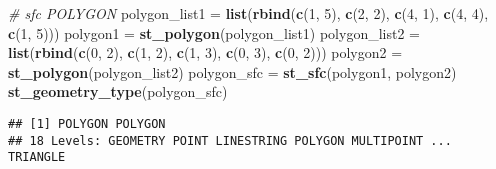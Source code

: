 \documentclass[]{article}
\newenvironment{Shaded}{\begin{snugshade}}{\end{snugshade}}
\newcommand{\CommentTok}[1]{\textcolor[rgb]{0.56,0.35,0.01}{\textit{#1}}}
\newcommand{\DecValTok}[1]{\textcolor[rgb]{0.00,0.00,0.81}{#1}}
\newcommand{\KeywordTok}[1]{\textcolor[rgb]{0.13,0.29,0.53}{\textbf{#1}}}
\newcommand{\NormalTok}[1]{#1}
\newcommand{\StringTok}[1]{\textcolor[rgb]{0.31,0.60,0.02}{#1}}
\begin{document}
\begin{Shaded}
\begin{Highlighting}[]
\CommentTok{# sfc POLYGON}
\NormalTok{polygon_list1 =}\StringTok{ }\KeywordTok{list}\NormalTok{(}\KeywordTok{rbind}\NormalTok{(}\KeywordTok{c}\NormalTok{(}\DecValTok{1}\NormalTok{, }\DecValTok{5}\NormalTok{), }\KeywordTok{c}\NormalTok{(}\DecValTok{2}\NormalTok{, }\DecValTok{2}\NormalTok{), }\KeywordTok{c}\NormalTok{(}\DecValTok{4}\NormalTok{, }\DecValTok{1}\NormalTok{), }\KeywordTok{c}\NormalTok{(}\DecValTok{4}\NormalTok{, }\DecValTok{4}\NormalTok{), }\KeywordTok{c}\NormalTok{(}\DecValTok{1}\NormalTok{, }\DecValTok{5}\NormalTok{)))}
\NormalTok{polygon1 =}\StringTok{ }\KeywordTok{st_polygon}\NormalTok{(polygon_list1)}
\NormalTok{polygon_list2 =}\StringTok{ }\KeywordTok{list}\NormalTok{(}\KeywordTok{rbind}\NormalTok{(}\KeywordTok{c}\NormalTok{(}\DecValTok{0}\NormalTok{, }\DecValTok{2}\NormalTok{), }\KeywordTok{c}\NormalTok{(}\DecValTok{1}\NormalTok{, }\DecValTok{2}\NormalTok{), }\KeywordTok{c}\NormalTok{(}\DecValTok{1}\NormalTok{, }\DecValTok{3}\NormalTok{), }\KeywordTok{c}\NormalTok{(}\DecValTok{0}\NormalTok{, }\DecValTok{3}\NormalTok{), }\KeywordTok{c}\NormalTok{(}\DecValTok{0}\NormalTok{, }\DecValTok{2}\NormalTok{)))}
\NormalTok{polygon2 =}\StringTok{ }\KeywordTok{st_polygon}\NormalTok{(polygon_list2)}
\NormalTok{polygon_sfc =}\StringTok{ }\KeywordTok{st_sfc}\NormalTok{(polygon1, polygon2)}
\KeywordTok{st_geometry_type}\NormalTok{(polygon_sfc)}
\end{Highlighting}
\end{Shaded}

\begin{verbatim}
## [1] POLYGON POLYGON
## 18 Levels: GEOMETRY POINT LINESTRING POLYGON MULTIPOINT ... TRIANGLE
\end{verbatim}
\end{document}
